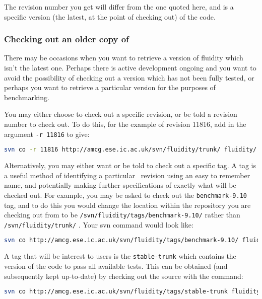 The revision number you get will differ from the one quoted here, and is a
specific version (the latest, at the point of checking out) of the \fluidity
code.

\subsubsection{Checking out an older copy of \fluidity}
\label{sect:subversion_checkout_old}

There may be occasions when you want to retrieve a version of fluidity which
isn't the latest one. Perhaps there is active development ongoing and you want
to avoid the possibility of checking out a version which has not been fully
tested, or perhaps you want to retrieve a particular version for the purposes
of benchmarking.

You may either choose to check out a specific revision, or be told a revision
number to check out. To do this, for the example of revision 11816, add in the
argument \lstinline[language=Bash]+-r 11816+ to give:

\begin{lstlisting}[language=Bash]
svn co -r 11816 http://amcg.ese.ic.ac.uk/svn/fluidity/trunk/ fluidity/
\end{lstlisting}

Alternatively, you may either want or be told to check out a specific \fluidity
tag. A tag is a useful method of identifying a particular \fluidity\ revision
using an easy to remember name, and potentially making further specifications 
of exactly what will be checked out. For example, you may be asked to check out
the \lstinline[language=Bash]+benchmark-9.10+ tag, and to do this you would
change the location within the repository you are checking out from to be
\lstinline[language=Bash]+/svn/fluidity/tags/benchmark-9.10/+ rather than
\lstinline[language=Bash]+/svn/fluidity/trunk/+ . Your svn command would look
like:

\begin{lstlisting}[language=Bash]
svn co http://amcg.ese.ic.ac.uk/svn/fluidity/tags/benchmark-9.10/ fluidity/
\end{lstlisting}

A tag that will be interest to users is the \lstinline[language=Bash]+stable-trunk+
which contains the version of the code to pass all available tests. This can be obtained
(and subsequently kept up-to-date) by checking out the source with the command:
\begin{lstlisting}[language=Bash]
svn co http://amcg.ese.ic.ac.uk/svn/fluidity/tags/stable-trunk fluidity/
\end{lstlisting}

